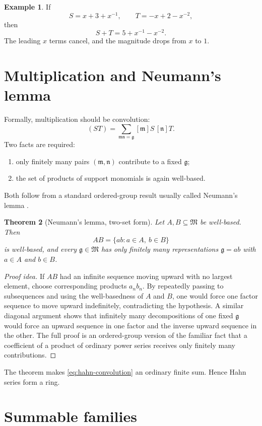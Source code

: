\documentclass[11pt,oneside]{book}
\newtheorem{theorem}{Theorem}[chapter]
\theoremstyle{definition}
\newtheorem{example}[theorem]{Example}
\theoremstyle{remark}
\newcommand{\M}{\mathfrak{M}}
\newcommand{\m}{\mathfrak{m}}
\newcommand{\n}{\mathfrak{n}}
\newcommand{\g}{\mathfrak{g}}
\begin{document}
\begin{example}
If
\[
 S=x+3+x^{-1},\qquad T=-x+2-x^{-2},
\]
then
\[
 S+T=5+x^{-1}-x^{-2}.
\]
The leading $x$ terms cancel, and the magnitude drops from $x$ to $1$.
\end{example}

\section{Multiplication and Neumann's lemma}

Formally, multiplication should be convolution:
\begin{equation}
  [\g](ST)=\sum_{\m\n=\g}[\m]S\,[\n]T.
  \label{eq:hahn-convolution}
\end{equation}
Two facts are required:
\begin{enumerate}
\item only finitely many pairs $(\m,\n)$ contribute to a fixed $\g$;
\item the set of products of support monomials is again well-based.
\end{enumerate}
Both follow from a standard ordered-group result usually called Neumann's
lemma \cite{Hahn1907,Neumann1949,vanDerHoevenBook}.

\begin{theorem}[Neumann's lemma, two-set form]
Let $A,B\subseteq\M$ be well-based. Then
\[
  AB=\{ab:a\in A,\ b\in B\}
\]
is well-based, and every $\g\in\M$ has only finitely many representations
$\g=ab$ with $a\in A$ and $b\in B$.
\end{theorem}

\begin{proof}[Proof idea]
If $AB$ had an infinite sequence moving upward with no largest element, choose
corresponding products $a_nb_n$. By repeatedly passing to subsequences and using
the well-basedness of $A$ and $B$, one would force one factor sequence to move
upward indefinitely, contradicting the hypothesis. A similar diagonal argument
shows that infinitely many decompositions of one fixed $\g$ would force an
upward sequence in one factor and the inverse upward sequence in the other. The
full proof is an ordered-group version of the familiar fact that a coefficient
of a product of ordinary power series receives only finitely many contributions.
\end{proof}

The theorem makes \eqref{eq:hahn-convolution} an ordinary finite sum. Hence Hahn
series form a ring.

\section{Summable families}
\end{document}
